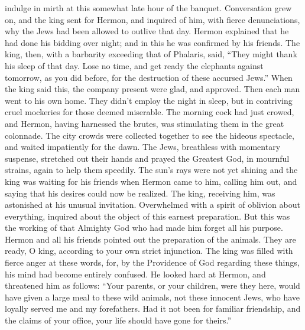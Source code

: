 indulge in mirth at this somewhat late hour of the banquet.
 Conversation grew on, and the king sent for Hermon, and
inquired of him, with fierce denunciations, why the Jews had been
allowed to outlive that day.  Hermon explained that he
had done his bidding over night; and in this he was confirmed by his
friends.  The king, then, with a barbarity exceeding that
of Phalaris, said, ``They might thank his sleep of that day. Lose no
time, and get ready the elephants against tomorrow, as you did before,
for the destruction of these accursed Jews.''  When the
king said this, the company present were glad, and approved. Then each
man went to his own home.  They didn't employ the night
in sleep, but in contriving cruel mockeries for those deemed miserable.
 The morning cock had just crowed, and Hermon, having
harnessed the brutes, was stimulating them in the great colonnade.
 The city crowds were collected together to see the
hideous spectacle, and waited impatiently for the dawn. 
The Jews, breathless with momentary suspense, stretched out their hands
and prayed the Greatest God, in mournful strains, again to help them
speedily.  The sun's rays were not yet shining and the
king was waiting for his friends when Hermon came to him, calling him
out, and saying that his desires could now be realized. 
The king, receiving him, was astonished at his unusual invitation.
Overwhelmed with a spirit of oblivion about everything, inquired about
the object of this earnest preparation.  But this was the
working of that Almighty God who had made him forget all his purpose.
 Hermon and all his friends pointed out the preparation
of the animals. They are ready, O king, according to your own strict
injunction.  The king was filled with fierce anger at
these words, for, by the Providence of God regarding these things, his
mind had become entirely confused. He looked hard at Hermon, and
threatened him as follows:  ``Your parents, or your
children, were they here, would have given a large meal to these wild
animals, not these innocent Jews, who have loyally served me and my
forefathers.  Had it not been for familiar friendship,
and the claims of your office, your life should have gone for theirs.''

